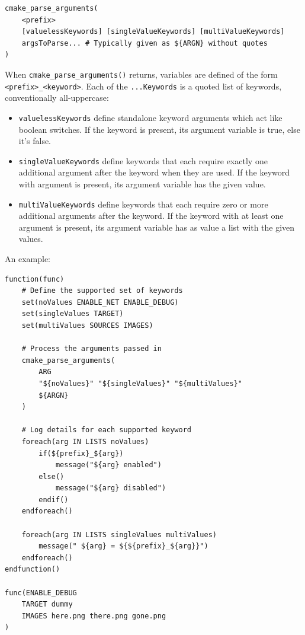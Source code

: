 \documentclass[table, xcdraw]{article}%
\begin{document}
\begin{verbatim}
cmake_parse_arguments(
    <prefix>
    [valuelessKeywords] [singleValueKeywords] [multiValueKeywords]
    argsToParse... # Typically given as ${ARGN} without quotes
)
\end{verbatim}

When \texttt{cmake_parse_arguments()} returns, variables are defined of the form \texttt{<prefix>_<keyword>}. Each of the \texttt{...Keywords} is a quoted list of keywords, conventionally all-uppercase:

\begin{itemize}
    \item \texttt{valuelessKeywords} define standalone keyword arguments which act like boolean switches. If the keyword is present, its argument variable is true, else it's false.
    \item \texttt{singleValueKeywords} define keywords that each require exactly one additional argument after the keyword when they are used. If the keyword with argument is present, its argument variable has the given value.
    \item \texttt{multiValueKeywords} define keywords that each require zero or more additional arguments after the keyword. If the keyword with at least one argument is present, its argument variable has as value a list with the given values.
\end{itemize}

An example:

\begin{verbatim}
function(func)
    # Define the supported set of keywords
    set(noValues ENABLE_NET ENABLE_DEBUG)
    set(singleValues TARGET)
    set(multiValues SOURCES IMAGES)
    
    # Process the arguments passed in
    cmake_parse_arguments(
        ARG
        "${noValues}" "${singleValues}" "${multiValues}"
        ${ARGN}
    )
    
    # Log details for each supported keyword
    foreach(arg IN LISTS noValues)
        if(${prefix}_${arg})
            message("${arg} enabled")
        else()
            message("${arg} disabled")
        endif()
    endforeach()
    
    foreach(arg IN LISTS singleValues multiValues)
        message(" ${arg} = ${${prefix}_${arg}}")
    endforeach()
endfunction()

func(ENABLE_DEBUG
    TARGET dummy
    IMAGES here.png there.png gone.png
)
\end{verbatim}
\end{document}
